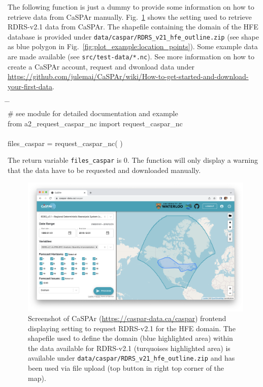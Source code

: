 \documentclass[10pt,a4paper,titlepage,parskip]{scrartcl}
\newenvironment{ttfont}{\fontfamily{\ttdefault}\selectfont}{\par}
\newcommand{\GRAU}[1]{\textcolor{ufzgray2}{#1}}
\begin{document}
The following function is just a dummy to provide some information on how to retrieve data from CaSPAr manually. Fig.~\ref{fig:request_data_caspar} shows the setting used to retrieve RDRS-v2.1 data from CaSPAr. The shapefile containing the domain of the HFE database is provided under \texttt{data/caspar/RDRS\_v21\_hfe\_outline.zip} (see shape as blue polygon in Fig.~\ref{fig:plot_example:location_points}). Some example data are made available (see \texttt{src/test-data/*.nc}). See more information on how to create a CaSPAr account, request and dwonload data under \url{https://github.com/julemai/CaSPAr/wiki/How-to-get-started-and-download-your-first-data}.
\begin{framed}
	\vspace*{-1.2cm}
	\begin{ttfont}
		\begin{tabbing}
			\hspace{1.0cm} \= \hspace{3.2cm} \= \kill \\[4pt]
			\GRAU{\# see module for detailed documentation and example}\\
			from a2\_request\_caspar\_nc import request\_caspar\_nc\\
			\\
			files\_caspar = request\_caspar\_nc( ) \> 
		\end{tabbing}
	\end{ttfont}
	\vspace*{-0.3cm}
\end{framed}
\vspace*{-0.3cm}
The return variable \texttt{files\_caspar} is 0. The function will only display a warning that the data have to be requested and downloaded manually. 
\begin{figure}[h]
	\centering
	\includegraphics[width=\linewidth]{figures/caspar-request-hfe.png}
	\caption{Screenshot of CaSPAr (\url{https://caspar-data.ca/caspar}) frontend displaying setting to request RDRS-v2.1 for the HFE domain. The shapefile used to define the domain (blue highlighted area) within the data available for RDRS-v2.1 (turquoises highlighted area) is available under \texttt{data/caspar/RDRS\_v21\_hfe\_outline.zip} and has been used via file upload (top button in right top corner of the map).}
	\label{fig:request_data_caspar}
\end{figure}
\pagebreak
\end{document}
